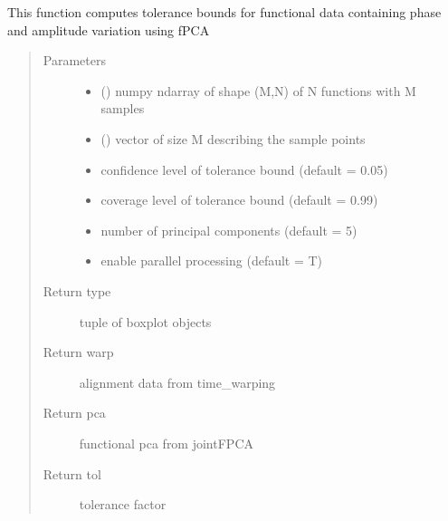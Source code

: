 \documentclass[letterpaper,10pt,english]{sphinxmanual}
\begin{document}

\begin{fulllineitems}
\label{\detokenize{tolerance:tolerance.pcaTB}}
This function computes tolerance bounds for functional data containing
phase and amplitude variation using fPCA
\begin{quote}\begin{description}
\item[{Parameters}] \leavevmode\begin{itemize}
\item {} 
 () \textendash{} numpy ndarray of shape (M,N) of N functions with M samples

\item {} 
 () \textendash{} vector of size M describing the sample points

\item {} 
 \textendash{} confidence level of tolerance bound (default = 0.05)

\item {} 
 \textendash{} coverage level of tolerance bound (default = 0.99)

\item {} 
 \textendash{} number of principal components (default = 5)

\item {} 
 \textendash{} enable parallel processing (default = T)

\end{itemize}

\item[{Return type}] \leavevmode
tuple of boxplot objects

\item[{Return warp}] \leavevmode
alignment data from time\_warping

\item[{Return pca}] \leavevmode
functional pca from jointFPCA

\item[{Return tol}] \leavevmode
tolerance factor

\end{description}\end{quote}

\end{fulllineitems}
\end{document}

